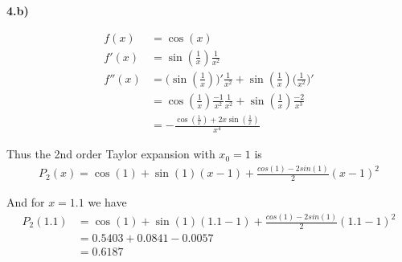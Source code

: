 \textbf{4.b)}

\begin{align*}
f(x) &= \cos(x) \\
f'(x) &= \sin(\frac{1}{x}) \frac{1}{x^2}\\
f''(x) &= \Big( \sin(\frac{1}{x}) \Big)' \frac{1}{x^2} + \sin(\frac{1}{x}) \Big( \frac{1}{x^2}\Big)'\\
&= \cos(\frac{1}{x})\frac{-1}{x^2}\frac{1}{x^2} + \sin(\frac{1}{x}) \frac{-2}{x^3}\\
&= -\frac{\cos(\frac{1}{x}) + 2x\sin(\frac{1}{x})}{x^4}
\end{align*}

Thus the 2nd order Taylor expansion with $x_0 = 1$ is
\begin{align*}
P_2(x) = \cos(1) + \sin(1)(x-1) + \frac{cos(1) - 2sin(1)}{2}(x - 1)^2
\end{align*}

And for $x = 1.1$ we have
\begin{align*}
P_2(1.1) &= \cos(1) + \sin(1)(1.1-1) + \frac{cos(1) - 2sin(1)}{2}(1.1 - 1)^2\\
&= 0.5403 + 0.0841 - 0.0057\\
&= 0.6187
\end{align*}

\incomplete









